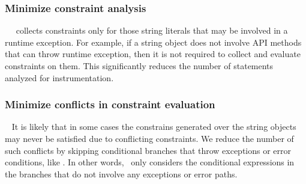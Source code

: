 
\subsubsection{Minimize constraint analysis}
\label{subsubsec:minimizeConstrintInstrumentation}
~\newline
\tool\ collects constraints only for those string literals that may be involved
in a runtime exception. For example, if a string object does not involve API
methods that can throw runtime exception, then it is not required to collect and
evaluate constraints on them. This significantly reduces the number of
statements analyzed for instrumentation.
 
\subsubsection{Minimize conflicts in constraint evaluation}
\label{subsubsec:minimizeConflictsinConstraintEvaluation}
~\newline
It is likely that in some cases the constrains generated over the string objects
may never be satisfied due to conflicting constraints. We reduce the number of
such conflicts by skipping conditional branches that throw exceptions or
error conditions, like . In other words, \tool\ only
considers the conditional expressions in the branches that do not involve any
exceptions or error paths.


